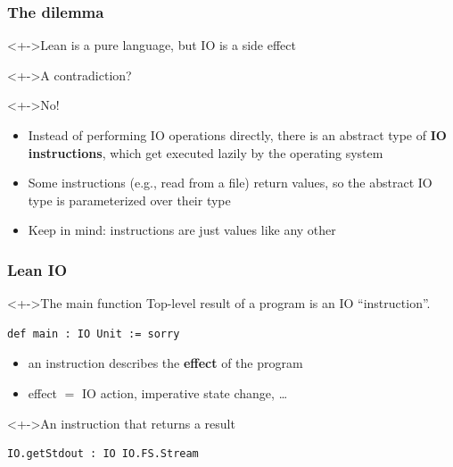 \documentclass{beamer}
\begin{document}
\begin{frame}[fragile]
  \frametitle{The dilemma}
  \begin{alertblock}<+->{Lean is a pure language, but IO is a side effect}
  \end{alertblock}
  \begin{block}<+->{A contradiction?}
  \end{block}
  \begin{block}<+->{No!}
    \begin{itemize}
    \item Instead of performing IO operations directly, there is an
      abstract type of \textbf{IO instructions}, which get executed
      lazily by the operating system
    \item Some instructions (e.g., read from a file) return values, so the abstract IO type is parameterized over their type
    \item Keep in mind: instructions are just values like any other
  \end{itemize}
  \end{block}
\end{frame}
\begin{frame}[fragile]
  \frametitle{Lean IO}

\begin{block}<+->{The main function}
  Top-level result of a program is an IO ``instruction''.
\begin{lstlisting}
def main : IO Unit := sorry
\end{lstlisting}
  \begin{itemize}
  \item an instruction describes the \textbf{effect} of the program
  \item effect $=$ IO action, imperative state change, \dots
  \end{itemize}
\end{block}
\begin{block}<+->{An instruction that returns a result}
\begin{lstlisting}
IO.getStdout : IO IO.FS.Stream
\end{lstlisting}
\end{block}
\end{frame}
\end{document}

